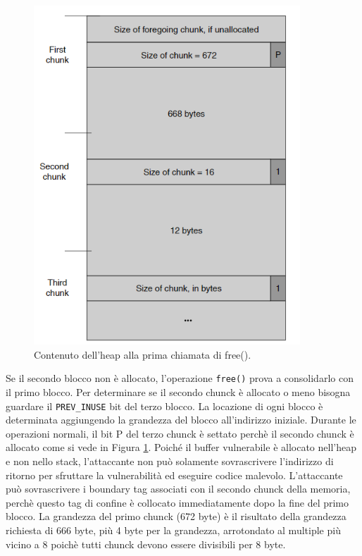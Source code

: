 \begin{figure}[H]
    \centering
    \includegraphics[width=10cm, keepaspectratio]{capitoli/secure_coding/img/cap_4/heap_prima_free.png}
    \caption{Contenuto dell'heap alla prima chiamata di free().}\label{fig:heap_prima_free}
\end{figure}
Se il secondo blocco non è allocato, l'operazione \verb|free()| prova a consolidarlo con il primo blocco. Per determinare se il secondo chunck è allocato o meno bisogna guardare il \verb|PREV_INUSE| bit del terzo blocco. La locazione di ogni blocco è determinata aggiungendo la grandezza del blocco all'indirizzo iniziale. Durante le operazioni normali, il bit P del terzo chunck è settato perchè il secondo chunck è allocato come si vede in Figura \ref{fig:heap_prima_free}.
Poiché il buffer vulnerabile è allocato nell'heap e non nello stack, l'attaccante non può solamente sovrascrivere l'indirizzo di ritorno per sfruttare la vulnerabilità ed eseguire codice malevolo. L'attaccante può sovrascrivere i boundary tag associati con il secondo chunck della memoria, perchè questo tag di confine è collocato immediatamente dopo la fine del primo blocco. La grandezza del primo chunck (672 byte) è il risultato della grandezza richiesta di 666 byte, più 4 byte per la grandezza, arrotondato al multiple più vicino a 8 poichè tutti chunck devono essere divisibili per 8 byte.
